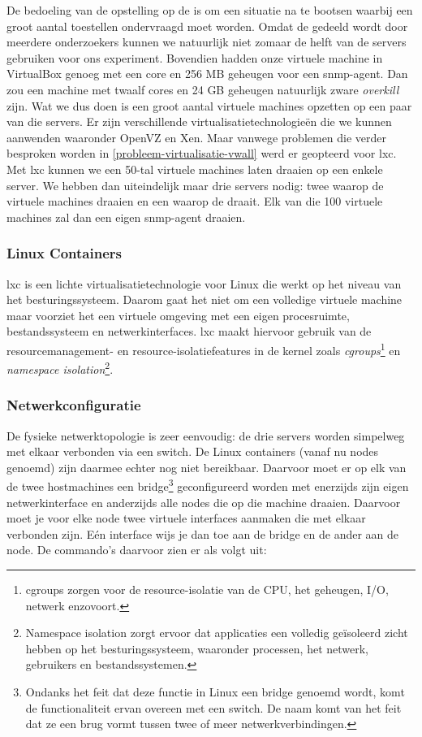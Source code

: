 De bedoeling van de opstelling op de \vwall{}  is om een situatie na te bootsen waarbij een groot aantal toestellen ondervraagd moet worden.
Omdat de \vwall{} gedeeld wordt door meerdere onderzoekers kunnen we natuurlijk niet zomaar de helft van de servers gebruiken voor ons experiment.
Bovendien hadden onze virtuele machine in VirtualBox genoeg met een core en 256 MB geheugen voor een \gls{snmp-agent}.
Dan zou een machine met twaalf cores en 24 GB geheugen natuurlijk zware \textit{overkill} zijn.
Wat we dus doen is een groot aantal virtuele machines opzetten op een paar van die servers.
Er zijn verschillende virtualisatietechnologieën die we kunnen aanwenden waaronder OpenVZ en Xen.
Maar vanwege problemen die verder besproken worden in \cref{probleem-virtualisatie-vwall} werd er geopteerd voor \gls{lxc}.
Met \gls{lxc} kunnen we een 50-tal virtuele machines laten draaien op een enkele server.
We hebben dan uiteindelijk maar drie servers nodig: twee waarop de virtuele machines draaien en een waarop de \nwmretriever{} draait.
Elk van die 100 virtuele machines zal dan een eigen \gls{snmp-agent} draaien.

\subsubsection{Linux Containers}
\label{lxc}

\gls{lxc} is een lichte virtualisatietechnologie voor Linux die werkt op het niveau van het besturingssysteem.
Daarom gaat het niet om een volledige virtuele machine maar voorziet het een virtuele omgeving met een eigen procesruimte, bestandssysteem en netwerkinterfaces.
\gls{lxc} maakt hiervoor gebruik van de resourcemanagement- en resource-isolatiefeatures in de kernel zoals \textit{\gls{cgroups}}\footnote{
	\gls{cgroups} zorgen voor de resource-isolatie van de CPU, het geheugen, I/O, netwerk enzovoort\cite{lxc-wiki}.
} en \textit{namespace isolation}\footnote{
	Namespace isolation zorgt ervoor dat applicaties een volledig geïsoleerd zicht hebben op het besturingssysteem,
	waaronder processen, het netwerk, gebruikers en bestandssystemen\cite{lxc-wiki}.
}\cite{lxc-explained, lxc-wiki}.


\subsubsection{Netwerkconfiguratie}

De fysieke netwerktopologie is zeer eenvoudig: de drie servers worden simpelweg met elkaar verbonden via een switch.
De Linux containers (vanaf nu nodes genoemd) zijn daarmee echter nog niet bereikbaar.
Daarvoor moet er op elk van de twee hostmachines een bridge\footnote{
	Ondanks het feit dat deze functie in Linux een bridge genoemd wordt, komt de functionaliteit ervan overeen met een switch.
	De naam komt van het feit dat ze een brug vormt tussen twee of meer netwerkverbindingen.
} geconfigureerd worden met enerzijds zijn eigen netwerkinterface
en anderzijds alle nodes die op die machine draaien.
Daarvoor moet je voor elke node twee virtuele interfaces aanmaken die met elkaar verbonden zijn.
Eén interface wijs je dan toe aan de bridge en de ander aan de node\cite{lxc-config}.
De commando's daarvoor zien er als volgt uit:

